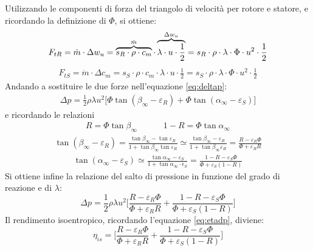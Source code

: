 Utilizzando le componenti di forza del triangolo di velocità per rotore e statore, e ricordando la definizione di $\Phi$, si ottiene:
\begin{align*}
F_{tR} = \dot{m} \cdot \Delta w_u = \overbrace{s_R \cdot \rho \cdot c_m}^\text{$ \dot{m} $} \cdot \overbrace{\lambda \cdot u \cdot \frac{1}{2}}^\text{$\Delta w_u$}=  s_R \cdot \rho \cdot \lambda \cdot \Phi \cdot u^2 \cdot \frac{1}{2}
\end{align*}
\begin{align*}
F_{tS} = \dot{m} \cdot \Delta c_m = s_S \cdot \rho \cdot c_m \cdot \lambda \cdot u \cdot \frac{1}{2} =s_S \cdot \rho \cdot \lambda \cdot \Phi \cdot u^2 \cdot \frac{1}{2}
\end{align*}
Andando a sostituire le due forze nell'equazione \ref{eq:deltap}:
\begin{align*}
\Delta p = \frac{1}{2} \rho \lambda u^2 \big[\Phi \tan \left( \beta_{\infty} - \varepsilon_R \right) + \Phi \tan \left( \alpha_{\infty} - \varepsilon_S \right) \big]
\end{align*}
e ricordando le relazioni
\begin{align*}
R = \Phi \tan \beta_{\infty} \;\;\;\;\;\;\;\;\;\;\; 1 - R = \Phi \tan \alpha_{\infty} 
\end{align*}
\begin{align*}
\tan ( \beta_{\infty} - \varepsilon_R ) = \frac{\tan \beta_{\infty} - \tan \varepsilon_R}{1 + \tan \beta_{\infty} \tan \varepsilon_R} \simeq \frac{\tan \beta_{\infty} - \varepsilon_R}{1 + \tan \beta_{\infty} \varepsilon_R}= \frac{R - \varepsilon_R \Phi}{\Phi + \varepsilon_R R}
\end{align*}
\begin{align*}
\tan (\alpha_{\infty} - \varepsilon_S) \simeq \frac{\tan \alpha_{\infty} - \varepsilon_S}{1 + \tan \alpha_{\infty} \cdot \epsilon_S} = \frac{1 - R - \varepsilon_S \Phi}{\Phi + \varepsilon_S (1-R)}
\end{align*}
Si ottiene infine la relazione del salto di pressione in funzione del grado di reazione e di $\lambda$:
\begin{equation}
\Delta p = \frac{1}{2} \rho \lambda u^2 \Bigg[ \frac{R - \varepsilon_R \Phi}{\Phi + \varepsilon_R R} + \frac{1 - R - \varepsilon_S \Phi}{\Phi + \varepsilon_S (1-R)} \Bigg]
\end{equation}
Il rendimento isoentropico, ricordando l'equazione \ref{eq:etadp}, diviene:
\begin{equation}
\boxed{ \eta_{is} = \Bigg[ \frac{R - \varepsilon_R \Phi}{\Phi + \varepsilon_R R} + \frac{1 - R - \varepsilon_S \Phi}{\Phi + \varepsilon_S (1-R)} \Bigg] }
\end{equation}

